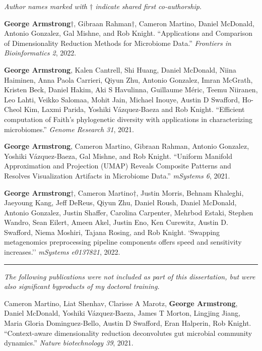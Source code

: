 \begin{frontmatter}
\begin{vitapage}
\begin{publications}

    \item \textsl{Author names marked with $\dagger$ indicate shared first co-authorship}.

    \item \textbf{George Armstrong}$\dagger$, Gibraan Rahman$\dagger$, Cameron Martino, Daniel McDonald, Antonio Gonzalez, Gal Mishne, and Rob Knight. ``Applications and Comparison of Dimensionality Reduction Methods for Microbiome Data.'' \textit{Frontiers in Bioinformatics 2}, 2022.
    
    \item \textbf{George Armstrong}, Kalen Cantrell, Shi Huang, Daniel McDonald, Niina Haiminen, Anna Paola Carrieri, Qiyun Zhu, Antonio Gonzalez, Imran McGrath, Kristen Beck, Daniel Hakim, Aki S Havulinna, Guillaume M\'eric, Teemu Niiranen, Leo Lahti, Veikko Salomaa, Mohit Jain, Michael Inouye, Austin D Swafford, Ho-Cheol Kim, Laxmi Parida, Yoshiki V\'azquez-Baeza and Rob Knight. ``Efficient computation of Faith's phylogenetic diversity with applications in characterizing microbiomes.'' \textit{Genome Research 31}, 2021.
    
    \item \textbf{George Armstrong}, Cameron Martino, Gibraan Rahman, Antonio Gonzalez, Yoshiki V\'azquez-Baeza, Gal Mishne, and Rob Knight. ``Uniform Manifold Approximation and Projection (UMAP) Reveals Composite Patterns and Resolves Visualization Artifacts in Microbiome Data.'' \textit{mSystems 6}, 2021.
    
    \item \textbf{George Armstrong}$\dagger$, Cameron Martino$\dagger$, Justin Morris, Behnam Khaleghi, Jaeyoung Kang, Jeff DeReus, Qiyun Zhu, Daniel Roush, Daniel McDonald, Antonio Gonzalez, Justin Shaffer, Carolina Carpenter, Mehrbod Estaki, Stephen Wandro, Sean Eilert, Ameen Akel, Justin Eno, Ken Curewitz, Austin D. Swafford, Niema Moshiri, Tajana Rosing, and Rob Knight. `Swapping metagenomics preprocessing pipeline components offers speed and sensitivity increases.''  \textit{mSystems e0137821}, 2022.

    \item \noindent\rule[0.5ex]{\linewidth}{0.5pt}

    \textsl{The following publications were not included as part of this dissertation, but were also significant byproducts of my doctoral training.}

    \item Cameron Martino, Liat Shenhav, Clarisse A Marotz, \textbf{George Armstrong}, Daniel McDonald, Yoshiki V\'azquez-Baeza, James T Morton, Lingjing Jiang, Maria Gloria Dominguez-Bello, Austin D Swafford, Eran Halperin, Rob Knight. ``Context-aware dimensionality reduction deconvolutes gut microbial community dynamics.'' \textit{Nature biotechnology 39}, 2021.
    

\end{publications}
\end{vitapage}
\end{frontmatter}
